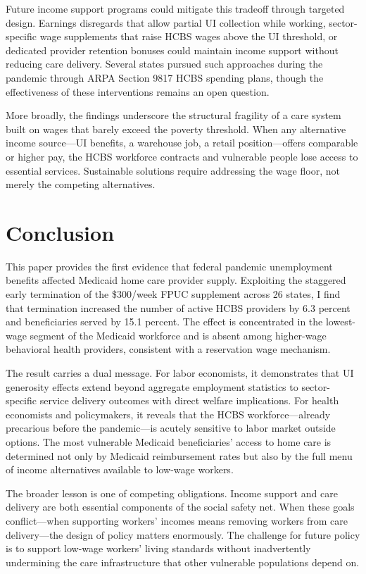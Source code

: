 \documentclass[12pt]{article}
\begin{document}
Future income support programs could mitigate this tradeoff through targeted design. Earnings disregards that allow partial UI collection while working, sector-specific wage supplements that raise HCBS wages above the UI threshold, or dedicated provider retention bonuses could maintain income support without reducing care delivery. Several states pursued such approaches during the pandemic through ARPA Section 9817 HCBS spending plans, though the effectiveness of these interventions remains an open question.

More broadly, the findings underscore the structural fragility of a care system built on wages that barely exceed the poverty threshold. When any alternative income source---UI benefits, a warehouse job, a retail position---offers comparable or higher pay, the HCBS workforce contracts and vulnerable people lose access to essential services. Sustainable solutions require addressing the wage floor, not merely the competing alternatives.


\section{Conclusion}

This paper provides the first evidence that federal pandemic unemployment benefits affected Medicaid home care provider supply. Exploiting the staggered early termination of the \$300/week FPUC supplement across 26 states, I find that termination increased the number of active HCBS providers by 6.3 percent and beneficiaries served by 15.1 percent. The effect is concentrated in the lowest-wage segment of the Medicaid workforce and is absent among higher-wage behavioral health providers, consistent with a reservation wage mechanism.

The result carries a dual message. For labor economists, it demonstrates that UI generosity effects extend beyond aggregate employment statistics to sector-specific service delivery outcomes with direct welfare implications. For health economists and policymakers, it reveals that the HCBS workforce---already precarious before the pandemic---is acutely sensitive to labor market outside options. The most vulnerable Medicaid beneficiaries' access to home care is determined not only by Medicaid reimbursement rates but also by the full menu of income alternatives available to low-wage workers.

The broader lesson is one of competing obligations. Income support and care delivery are both essential components of the social safety net. When these goals conflict---when supporting workers' incomes means removing workers from care delivery---the design of policy matters enormously. The challenge for future policy is to support low-wage workers' living standards without inadvertently undermining the care infrastructure that other vulnerable populations depend on.
\end{document}
